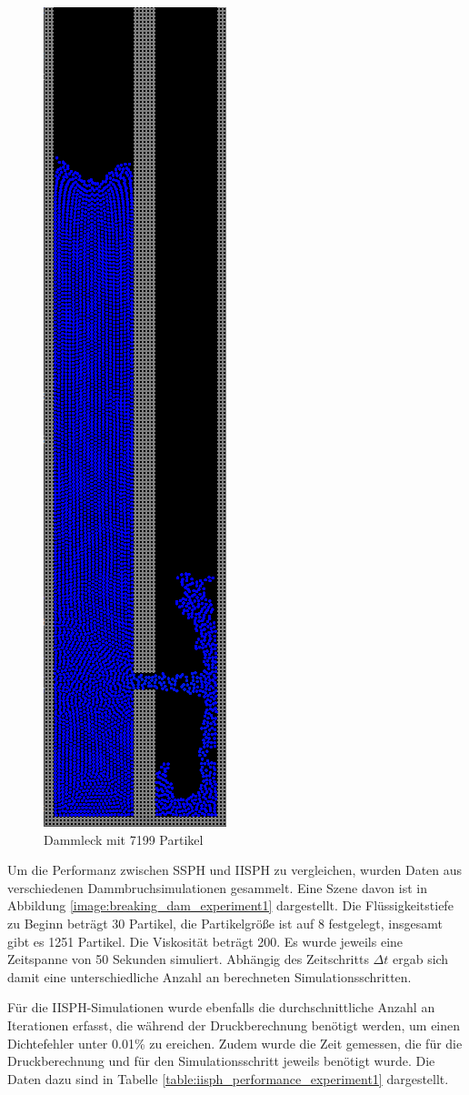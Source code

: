 \documentclass[11pt,
a4paper,
parskip=half, %
BCOR=10mm, %
english,
ngerman]{scrreprt}
\begin{document}
\begin{figure}[htb]
\begin{minipage}[t]{0.45\linewidth}
        \includegraphics[width=0.3\linewidth]{Dammleck_Experiment2.png}
        \caption{Dammleck mit 7199 Partikel}
        \label{image:leaky_dam_experiment2}
    \end{minipage}
\end{figure}

Um die Performanz zwischen SSPH und IISPH zu vergleichen, wurden Daten aus verschiedenen Dammbruchsimulationen gesammelt.
Eine Szene davon ist in Abbildung \ref{image:breaking_dam_experiment1} dargestellt.
Die Flüssigkeitstiefe zu Beginn beträgt 30 Partikel, die Partikelgröße ist auf 8 festgelegt, insgesamt gibt es 1251 Partikel.
Die Viskosität beträgt 200.
Es wurde jeweils eine Zeitspanne von 50 Sekunden simuliert. 
Abhängig des Zeitschritts $\Delta t$ ergab sich damit eine unterschiedliche Anzahl an berechneten Simulationsschritten.

Für die IISPH-Simulationen wurde ebenfalls die durchschnittliche Anzahl an Iterationen erfasst,
die während der Druckberechnung benötigt werden, um einen Dichtefehler unter 0.01\% zu ereichen.
Zudem wurde die Zeit gemessen, die für die Druckberechnung und für den Simulationsschritt jeweils benötigt wurde.
Die Daten dazu sind in Tabelle \ref{table:iisph_performance_experiment1} dargestellt.
\end{document}
